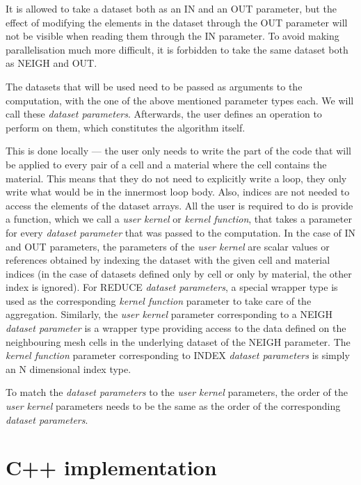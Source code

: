 \documentclass[fontsize=11pt, appendixprefix=true]{scrreprt}
\begin{document}
It is allowed to take a dataset both as an IN and an OUT parameter, but the
effect of modifying the elements in the dataset through the OUT parameter will
not be visible when reading them through the IN parameter. To avoid making
parallelisation much more difficult, it is forbidden to take the same dataset
both as NEIGH and OUT.

The datasets that will be used need to be passed as arguments to the
computation, with the one of the above mentioned parameter types each. We will
call these \textit{dataset parameters}. Afterwards, the user defines an
operation to perform on them, which constitutes the algorithm itself.

This is done locally --- the user only needs to write the part of the code that
will be applied to every pair of a cell and a material where the cell contains
the material. This means that they do not need to explicitly write a loop, they
only write what would be in the innermost loop body. Also, indices are not
needed to access the elements of the dataset arrays. All the user is required to
do is provide a function, which we call a \textit{user kernel} or \textit{kernel
  function}, that takes a parameter for every \textit{dataset parameter} that
was passed to the computation. In the case of IN and OUT parameters, the
parameters of the \textit{user kernel} are scalar values or references obtained
by indexing the dataset with the given cell and material indices (in the case of
datasets defined only by cell or only by material, the other index is
ignored). For REDUCE \textit{dataset parameters}, a special wrapper type is used
as the corresponding \textit{kernel function} parameter to take care of the
aggregation. Similarly, the \textit{user kernel} parameter corresponding to a
NEIGH \textit{dataset parameter} is a wrapper type providing access to the data
defined on the neighbouring mesh cells in the underlying dataset of the NEIGH
parameter. The \textit{kernel function} parameter corresponding to INDEX
\textit{dataset parameters} is simply an N dimensional index type.

To match the \textit{dataset parameters} to the \textit{user kernel} parameters,
the order of the \textit{user kernel} parameters needs to be the same as the
order of the corresponding \textit{dataset parameters}.

\section{C++ implementation}
\end{document}
